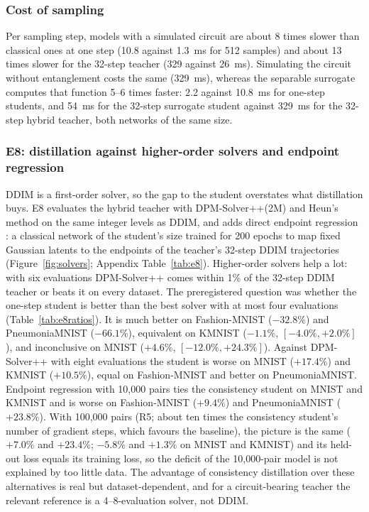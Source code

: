 \documentclass[11pt]{article}
\begin{document}
\subsubsection{Cost of sampling}
\label{sec:res-cost}

Per sampling step, models with a simulated circuit are about 8 times slower than
classical ones at one step (10.8 against 1.3~ms for 512 samples) and about 13 times
slower for the 32-step teacher (329 against 26~ms). Simulating the circuit without
entanglement costs the same (329~ms), whereas the separable surrogate computes that
function 5--6 times faster: 2.2 against 10.8~ms for one-step students, and 54~ms for
the 32-step surrogate student against 329~ms for the 32-step hybrid teacher, both
networks of the same size.



\subsubsection{E8: distillation against higher-order solvers and endpoint regression}
\label{sec:res-e8}

DDIM is a first-order solver, so the gap to the student overstates what
distillation buys. E8 evaluates the hybrid teacher with DPM-Solver++(2M)
\citep{lu2022dpmsolverpp} and Heun's method \citep{karras2022edm} on the same
integer levels as DDIM, and adds direct endpoint regression
\citep{luhman2021knowledge}: a classical network of the student's size trained for
200 epochs to map fixed Gaussian latents to the endpoints of the teacher's 32-step
DDIM trajectories (Figure~\ref{fig:solvers}; Appendix Table~\ref{tab:e8}).
Higher-order solvers help a lot: with six evaluations DPM-Solver++ comes within 1\%
of the 32-step DDIM teacher or beats it on every dataset. The preregistered question
was whether the one-step student is better than the best solver with at most four
evaluations (Table~\ref{tab:e8ratios}). It is much better on Fashion-MNIST
($-32.8\%$) and PneumoniaMNIST ($-66.1\%$), equivalent on KMNIST ($-1.1\%$,
$[-4.0\%,+2.0\%]$), and inconclusive on MNIST ($+4.6\%$, $[-12.0\%,+24.3\%]$). Against
DPM-Solver++ with eight evaluations the student is worse on MNIST ($+17.4\%$) and
KMNIST ($+10.5\%$), equal on Fashion-MNIST and better on PneumoniaMNIST. Endpoint
regression with 10{,}000 pairs ties the consistency student on MNIST and KMNIST and is
worse on Fashion-MNIST ($+9.4\%$) and PneumoniaMNIST ($+23.8\%$). With 100{,}000 pairs
(R5; about ten times the consistency student's number of gradient steps, which
favours the baseline), the picture is the same ($+7.0\%$ and $+23.4\%$; $-5.8\%$ and
$+1.3\%$ on MNIST and KMNIST) and its held-out loss equals its training loss, so the
deficit of the 10{,}000-pair model is not explained by too little data. The advantage of consistency distillation over these alternatives
is real but dataset-dependent, and for a circuit-bearing teacher the relevant
reference is a 4--8-evaluation solver, not DDIM.
\end{document}
